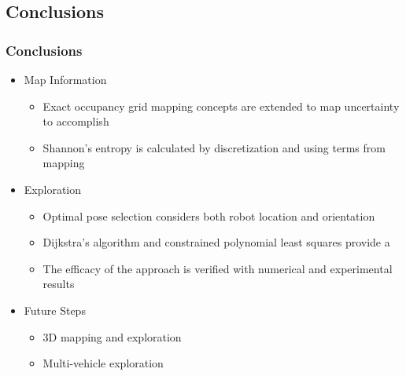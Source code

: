 \documentclass[11pt,professionalfonts,hyperref={pdftex,pdfpagemode=none,pdfstartview=FitH}]{beamer}
\renewcommand{\emph}[1]{\textit{\textbf{\color{blue}{#1}}}}
\begin{document}
\subsection*{Conclusions}

\begin{frame}
\frametitle{Conclusions}
\begin{itemize}
	\item Map Information
	\begin{itemize}
		\item Exact occupancy grid mapping concepts are extended to map uncertainty to accomplish \emph{autonomous exploration}
		\item Shannon's entropy is calculated \emph{directly} by discretization and using terms from mapping
	\end{itemize}
	\pause
	\item Exploration
	\begin{itemize}
		\item Optimal pose selection considers both robot location and orientation
		\item Dijkstra's algorithm and constrained polynomial least squares provide a \emph{collision-free trajectory}
		\item The efficacy of the approach is verified with numerical and experimental results
	\end{itemize}
	\pause
	\item Future Steps
	\begin{itemize}
		\item 3D mapping and exploration
		\item Multi-vehicle exploration
	\end{itemize}
\end{itemize}
\end{frame}
\end{document}
